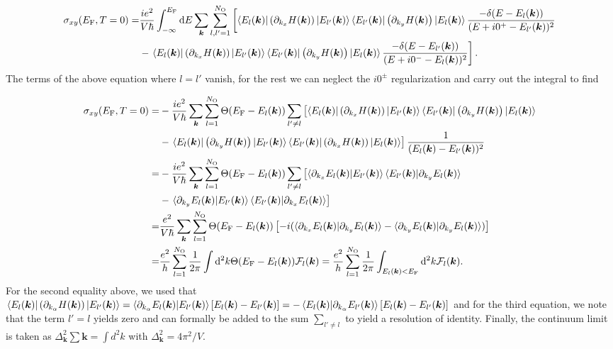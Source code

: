 \documentclass[aps,prb,amsmath,amssymb,twocolumn, superscriptaddress]{revtex4-2}
\begin{document}
\begin{align}
\sigma_{xy}(E_\mathrm{F}, T = 0) =& \frac{i e^2 }{V \hbar} \int_{- \infty}^{E_\mathrm{F}} \mathrm{d} E \sum_{\bm k} \sum_{l, l' = 1}^{N_\mathrm{O}} \left [ \bra{E_l(\bm k)}\left(\partial_{k_x} H(\bm k) \right)\ket{E_{l'}(\bm k)} \bra{E_{l'}(\bm k)} \left(\partial_{k_y} H(\bm k) \right)\ket{E_{l}(\bm k)}  \frac{- \delta(E - E_{l}(\bm k)) }{(E + i 0^+ - E_{l'}(\bm k))^2} \right .  \nonumber \\
& - \left.  \bra{E_l(\bm k)}\left(\partial_{k_x} H(\bm k) \right)\ket{E_{l'}(\bm k)} \bra{E_{l'}(\bm k)} \left(\partial_{k_y} H(\bm k) \right)\ket{E_{l}(\bm k)} \frac{- \delta(E - E_{l'}(\bm k)) }{(E + i 0^- - E_{l}(\bm k))^2} \right ].
\end{align}
The terms of the above equation where $l = l'$ vanish, for the rest we can neglect the $i 0^\pm$ regularization and carry out the integral to find

\begin{align}
\sigma_{xy}(E_\mathrm{F}, T = 0) =& -\frac{i e^2}{V \hbar} \sum_{\bm k} \sum_{l = 1}^{N_\mathrm{O}}\Theta(E_\mathrm{F} - E_l(\bm k))  \sum_{l' \neq l} \left [ \bra{E_l(\bm k)}\left(\partial_{k_x} H(\bm k) \right)\ket{E_{l'}(\bm k)} \bra{E_{l'}(\bm k)} \left(\partial_{k_y} H(\bm k) \right)\ket{E_{l}(\bm k)} \right .  \nonumber \\
& - \left.  \bra{E_l(\bm k)}\left(\partial_{k_y} H(\bm k) \right)\ket{E_{l'}(\bm k)} \bra{E_{l'}(\bm k)} \left(\partial_{k_x} H(\bm k) \right)\ket{E_{l}(\bm k)}  \right]  \frac{1}{(E_l(\bm k)  - E_{l'}(\bm k))^2} \nonumber \\
=& -\frac{ie^2}{V \hbar} \sum_{\bm k} \sum_{l = 1}^{N_\mathrm{O}}\Theta(E_\mathrm{F} - E_l(\bm k))  \sum_{l' \neq l} \left [ \braket{\partial_{k_x}  E_l(\bm k)|E_{l'}(\bm k)} \braket{E_{l'}(\bm k) |\partial_{k_y} E_{l}(\bm k)} \right . \nonumber \\
& - \left.  \braket{\partial_{k_y}  E_l(\bm k)|E_{l'}(\bm k)} \braket{E_{l'}(\bm k) |\partial_{k_x} E_{l}(\bm k)} \right] \nonumber \\
=& \frac{e^2}{V \hbar} \sum_{\bm k} \sum_{l = 1}^{N_\mathrm{O}}\Theta(E_\mathrm{F} - E_l(\bm k))   \left [-i (\braket{\partial_{k_x}  E_l(\bm k)|\partial_{k_y} E_{l}(\bm k)} - \braket{\partial_{k_y} E_l(\bm k)|\partial_{k_y} E_{l}(\bm k)}) \right ] \nonumber \\
=& \frac{e^2}{h} \sum_{l = 1}^{N_\mathrm{O}} \frac{1}{2 \pi} \int \mathrm{d}^2k  \Theta(E_\mathrm{F} - E_l(\bm k)) \mathcal F_l (\bm k) = \frac{e^2}{h} \sum_{l = 1}^{N_\mathrm{O}} \frac{1}{2 \pi} \int_{E_l(\bm k)<E_\mathrm{F}}\mathrm{d}^2k   \mathcal F_l (\bm k). \label{Eqn:Kubo_Bastin_clean}
\end{align}
For the second equality above, we used that $\bra{E_l(\bm k)}\left(\partial_{k_\alpha} H(\bm k) \right)\ket{E_{l'}(\bm k)} = \braket{\partial_{k_\alpha}  E_l(\bm k)|E_{l'}(\bm k)} [E_l(\bm k) - E_{l'}(\bm k)] = - \braket{E_l(\bm k)|\partial_{k_\alpha} E_{l'}(\bm k)} [E_l(\bm k) - E_{l'}(\bm k)]$ and for the third equation, we note that the term $l' = l$ yields zero and can formally be added to the sum $\sum_{l' \neq l}$ to yield a resolution of identity. Finally, the continuum limit is taken as $\Delta_{\bm k}^2 \sum{\bm k} = \int d^2 k$ with $\Delta_{\bm k}^2 = 4 \pi^2 / V$. 
\end{document}
